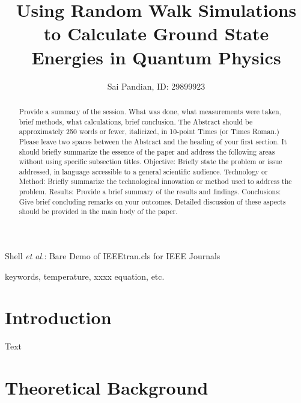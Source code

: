 \documentclass[journal]{IEEEtran}
\begin{document}
\title{Using Random Walk Simulations to Calculate Ground State Energies in Quantum Physics}

\author{Sai Pandian, ID: 29899923}%
        
{Shell \MakeLowercase{\textit{et al.}}: Bare Demo of IEEEtran.cls for IEEE Journals}

\maketitle

\begin{abstract}
Provide a summary of the session. What was done, 
what measurements were taken, brief methods, what calculations, brief conclusion.  The Abstract should be approximately 250 words or fewer, italicized, in 10-point Times (or Times Roman.) Please leave two spaces between the Abstract and the heading of your first section.
It should briefly summarize the essence of the paper and address the following areas without using specific subsection titles. Objective: Briefly state the problem or issue addressed, in language accessible to a general scientific audience. Technology or Method: Briefly summarize the technological innovation or method used to address the problem. Results: Provide a brief summary of the results and findings. Conclusions: Give brief concluding remarks on your outcomes. Detailed discussion of these aspects should be provided in the main body of the paper.
\end{abstract}

\begin{IEEEkeywords}
keywords, temperature, xxxx equation, etc.
\end{IEEEkeywords}

\section{Introduction}

 Text

\section{Theoretical Background}
\end{document}
